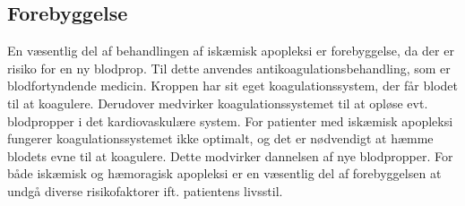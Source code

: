 \subsection{Forebyggelse}
En væsentlig del af behandlingen af iskæmisk apopleksi er forebyggelse, da der er risiko for en ny blodprop. Til dette anvendes antikoagulationsbehandling, som er blodfortyndende medicin. Kroppen har sit eget koagulationssystem, der får blodet til at koagulere. Derudover medvirker koagulationssystemet til at opløse evt. blodpropper i det kardiovaskulære system. For patienter med iskæmisk apopleksi fungerer koagulationssystemet ikke optimalt, og det er nødvendigt at hæmme blodets evne til at koagulere. Dette modvirker dannelsen af nye blodpropper. \cite{Kjaergaard2015}
For både iskæmisk og hæmoragisk apopleksi er en væsentlig del af forebyggelsen at undgå diverse risikofaktorer ift. patientens livsstil. \cite{Christensen2015}



